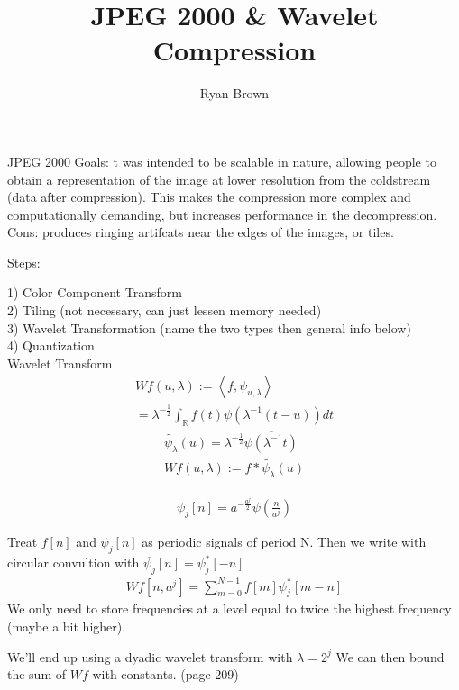 \documentclass{article}
\title{JPEG 2000 \& Wavelet Compression}
\author{Ryan Brown}
\begin{document}
	\maketitle
	JPEG 2000 Goals: t was intended to be scalable in nature, allowing people to obtain a representation of the image at lower resolution from the coldstream (data after compression).  This makes the compression more complex and computationally demanding, but increases performance in the decompression. \\ 

	Cons:  produces ringing artifcats near the edges of the images, or tiles.

	Steps: 

	1) Color Component Transform \\
	2) Tiling (not necessary, can just lessen memory needed)\\ 
	3) Wavelet Transformation (name the two types then general info below) \\ 
	4) Quantization \\ 


	Wavelet Transform
	\begin{align*}
		Wf(u,\lambda) := \left< f, \psi_{u,\lambda} \right> \\ = \lambda^{-\frac{1}{2}}\int_{\mathbb{R}} f(t) \psi \left( \lambda^{-1}(t-u)\right) dt 
	\end{align*}
	\begin{align*}
		\widetilde{\psi_{\lambda}}(u) = \lambda^{-\frac{1}{2}} \overline{\psi(\lambda^{-1}t)} \\ 
		Wf(u,\lambda) := f * \widetilde{\psi_{\lambda}}(u)
	\end{align*}


	\begin{align*}
		\psi_j [n] = a^{-\frac{a^j}{2}} \psi \left(\frac{n}{a^j}\right)
	\end{align*}

	Treat $f[n]$ and $\psi_j [n]$ as periodic signals of period N.  Then we write with circular convultion with $\overline{\psi_j}[n] = \psi_j^*[-n]$
	\begin{align*}
		Wf[n,a^j] = \sum_{m=0}^{N-1} f[m]\psi_j^* [m-n] 
	\end{align*}
	We only need to store frequencies at a level equal to twice the highest frequency (maybe a bit higher).  

	We'll end up using a dyadic wavelet transform with $\lambda = 2^j$
	We can then bound the sum of $Wf$ with constants. (page 209)
\end{document}
